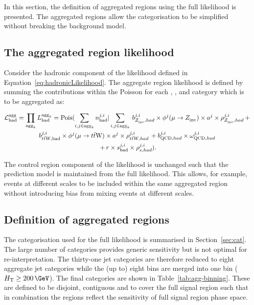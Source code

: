 In this section, the definition of aggregated regions 
using the full likelihood is presented. The aggregated regions allow the categorisation to be 
simplified without breaking the background model. 

\subsection{The aggregated region likelihood}

Consider the hadronic component of the likelihood defined in Equation~\ref{eq:hadronicLikelihood}.
The aggregate region likelihood is defined by summing the contributions within the Poisson for
each \mht, \scalht, \nb and \njet category which is to be aggregated as:

\begin{multline}
\label{eq:aggregatedLikelihood}
\mathcal{L}^{\text{agg}}_{\mathrm{had}} = \prod_{\text{agg}_{k}} {L}^{\text{agg}_{k}}_{\mathrm{had}} = \mathrm{Pois}(\sum_{i,j\in\text{agg}_{k}} n^{j,i}_{\mathrm{had}} |\sum_{i,j\in\text{agg}_{k}}\, b^{j,i}_{Z_{\rm inv}^{~},had}\times\phi^{j}(\mu\rightarrow Z_{\rm inv}^{~})\times a^{j}\times\rho^{j,i}_{Z_{\rm inv}^{~},had}\, + \\ 
b^{j,i}_{t\bar{t}\text{W},\mathrm{had}}\times\phi^{j}(\mu\rightarrow t\bar{t}\text{W})\times a^{j}\times\rho^{j,i}_{t\bar{t}\text{W},had}\, + b^{j,i}_{\text{QCD},had}\times\omega^{j,i}_{\text{QCD},had}\\\
+ \,r\times s^{j,i}_{\mathrm{had}}\times\rho^{j,i}_{s,had}).
\end{multline}

The control region component of the likelihood is unchanged such that the prediction model
is maintained from the full likelihood. This allows, for example, events 
at different scales to be included within the same aggregated region without introducing
bias from mixing events at different scales.

\subsection{Definition of aggregated regions}
\label{sec:ssr-alphat}
The categorisation used for the full likelihood is summarised in Section~\ref{sec:cat}. 
The large number of categories provides generic sensitivity but is not optimal for re-interpretation. 
The thirty-one jet categories are therefore reduced to eight aggregate jet categories while
the (up to) eight \scalht bins are merged into one bin ($\scalht \geq 200\,\GeV$).
The final categories are shown in Table~\ref{tab:agg-binning}.
These are defined to be disjoint, contiguous and to cover the full
signal region such that in combination the regions reflect the sensitivity of
full signal region phase space.


